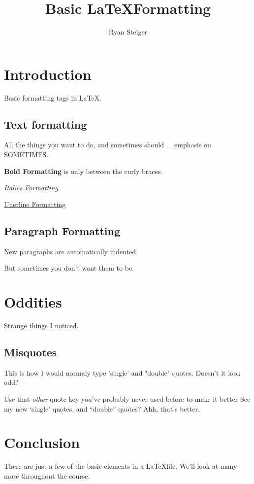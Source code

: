 \documentclass{article}
\title{Basic \LaTeX Formatting}
\author{Ryan Steiger}
\date{}
\begin{document}
\maketitle

\section{Introduction}

Basic formatting tags in \LaTeX.

\subsection{Text formatting}

All the things you want to do, and sometimes should ... emphasis on SOMETIMES.

\textbf{Bold Formatting} is only between the curly braces.

\emph{Italics Formatting}

\underline{Unerline Formatting}

\subsection{Paragraph Formatting}

New paragraphs are automatically indented.

\noindent But sometimes you don't want them to be.

\section{Oddities}

Strange things I noticed.

\subsection{Misquotes}

This is how I would normaly type 'single' and "double" quotes. Doesn't it look odd?

\noindent Use that \emph{other} quote key you've probably never used before to make it better
\noindent See my new `single' quotes, and ``double'' quotes? Ahh, that's better.

\section{Conclusion}

These are just a few of the basic elements in a \LaTeX file. We'll look at many more throughout the course.
\end{document}
